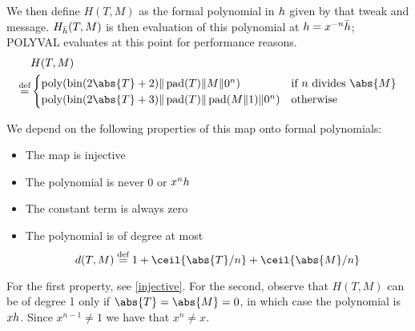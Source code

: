 \documentclass[hctr2.tex]{subfiles}
\begin{document}
We then define \(H(T, M)\) as the formal polynomial in \(h\) given
by that tweak and message.
\(H_{\bar{h}}(T, M)\) is then evaluation of this polynomial at
\(h = x^{-n}\bar{h}\); POLYVAL evaluates at this point for
performance reasons.
\begin{align*}
    & H(T, M) \\
    \defeq &
    \begin{cases}
        \poly(\fromint(2\abs{T} + 2) \Concat \pad(T) \Concat M \Concat 0^n) &
        \text{if } n \text{ divides } \abs{M} \\
        \poly(\fromint(2\abs{T} + 3) \Concat \pad(T) \Concat \pad(M \Concat 1) \Concat 0^n) &
        \text{otherwise}
    \end{cases}
\end{align*}

We depend on the following properties of this map 
onto formal polynomials:
\begin{itemize}
    \item The map is injective
    \item The polynomial is never \(0\) or \(x^nh\)
    \item The constant term is always zero
    \item The polynomial is of degree at most
    \begin{displaymath}
        d(T, M) \defeq 1 + \ceil{\abs{T}/n} + \ceil{\abs{M}/n}
    \end{displaymath}
\end{itemize}

For the first property, see \autoref{injective}.
For the second, observe that \(H(T, M)\)
can be of degree 1 only if \(\abs{T} = \abs{M} = 0\),
in which case the polynomial is \(xh\).
Since \(x^{n-1} \neq 1\) we have that \(x^n \neq x\).
\end{document}
